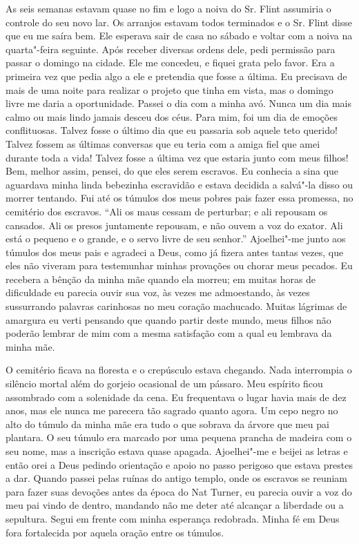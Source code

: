 As seis semanas estavam quase no fim e
logo a noiva do Sr. Flint assumiria o controle do seu novo lar. Os
arranjos estavam todos terminados e o Sr. Flint disse que eu me saíra
bem. Ele esperava sair de casa no sábado e voltar com a noiva na
quarta"-feira seguinte. Após receber diversas ordens dele, pedi permissão
para passar o domingo na cidade. Ele me concedeu, e fiquei grata pelo
favor. Era a primeira vez que pedia algo a ele e pretendia que fosse a
última. Eu precisava de mais de uma noite para realizar o projeto que
tinha em vista, mas o domingo livre me daria a oportunidade. Passei o
dia com a minha avó. Nunca um dia mais calmo ou mais lindo jamais desceu
dos céus. Para mim, foi um dia de emoções conflituosas. Talvez fosse o
último dia que eu passaria sob aquele teto querido! Talvez fossem as
últimas conversas que eu teria com a amiga fiel que amei durante toda a
vida! Talvez fosse a última vez que estaria junto com meus filhos! Bem,
melhor assim, pensei, do que eles serem escravos. Eu conhecia a sina que
aguardava minha linda bebezinha escravidão e estava decidida a salvá"-la
disso ou morrer tentando. Fui até os túmulos dos meus pobres pais fazer
essa promessa, no cemitério dos escravos. ``Ali os maus cessam de
perturbar; e ali repousam os cansados. Ali os presos juntamente
repousam, e não ouvem a voz do exator. Ali está o pequeno e o grande, e
o servo livre de seu senhor.'' Ajoelhei"-me junto aos túmulos dos meus
pais e agradeci a Deus, como já fizera antes tantas vezes, que eles não
viveram para testemunhar minhas provações ou chorar meus pecados. Eu
recebera a bênção da minha mãe quando ela morreu; em muitas horas de
dificuldade eu parecia ouvir sua voz, às vezes me admoestando, às vezes
sussurrando palavras carinhosas no meu coração machucado. Muitas
lágrimas de amargura eu verti pensando que quando partir deste mundo,
meus filhos não poderão lembrar de mim com a mesma satisfação com a qual
eu lembrava da minha mãe.

O cemitério ficava na floresta e o
crepúsculo estava chegando. Nada interrompia o silêncio mortal além do
gorjeio ocasional de um pássaro. Meu espírito ficou assombrado com a
solenidade da cena. Eu frequentava o lugar havia mais de dez anos, mas
ele nunca me parecera tão sagrado quanto agora. Um cepo negro no alto do
túmulo da minha mãe era tudo o que sobrava da árvore que meu pai
plantara. O seu túmulo era marcado por uma pequena prancha de madeira
com o seu nome, mas a inscrição estava quase apagada. Ajoelhei"-me e
beijei as letras e então orei a Deus pedindo orientação e apoio no passo
perigoso que estava prestes a dar. Quando passei pelas ruínas do antigo
templo, onde os escravos se reuniam para fazer suas devoções antes da
época do Nat Turner, eu parecia ouvir a voz do meu pai vindo de dentro,
mandando não me deter até alcançar a liberdade ou a sepultura. Segui em
frente com minha esperança redobrada. Minha fé em Deus fora fortalecida
por aquela oração entre os túmulos.

